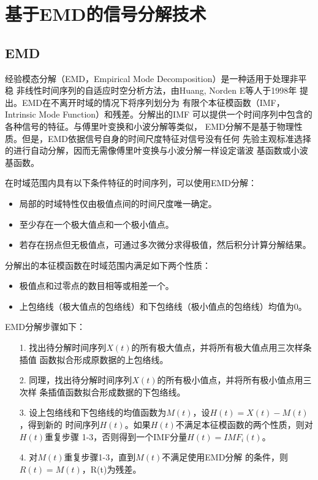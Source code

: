 \documentclass[AutoFakeBold]{LZUThesis}
\begin{document}
\section{基于EMD的信号分解技术}
\subsection{EMD}
经验模态分解（EMD，Empirical Mode Decomposition）是一种适用于处理非平稳
非线性时间序列的自适应时空分析方法，由Huang, Norden E等人于1998年
提出。EMD在不离开时域的情况下将序列划分为
有限个本征模函数（IMF，Intrinsic Mode Function）和残差。分解出的IMF
可以提供一个时间序列中包含的各种信号的特征。与傅里叶变换和小波分解等类似，
EMD分解不是基于物理性质。但是，EMD依据信号自身的时间尺度特征对信号没有任何
先验主观标准选择的进行自动分解，因而无需像傅里叶变换与小波分解一样设定谐波
基函数或小波基函数。

在时域范围内具有以下条件特征的时间序列，可以使用EMD分解：
\begin{itemize}
\item 局部的时域特性仅由极值点间的时间尺度唯一确定。
\item 至少存在一个极大值点和一个极小值点。
\item 若存在拐点但无极值点，可通过多次微分求得极值，然后积分计算分解结果。
\end{itemize}

分解出的本征模函数在时域范围内满足如下两个性质：
\begin{itemize}
\item 极值点和过零点的数目相等或相差一个。
\item 上包络线（极大值点的包络线）和下包络线（极小值点的包络线）均值为0。
\end{itemize}

EMD分解步骤如下：
\begin{itemize}
\item[1. ] 找出待分解时间序列$X(t)$的所有极大值点，并将所有极大值点用三次样条插值
函数拟合形成原数据的上包络线。
\item[2. ] 同理，找出待分解时间序列$X(t)$的所有极小值点，并将所有极小值点用三次样
条插值函数拟合形成数据的下包络线。
\item[3. ] 设上包络线和下包络线的均值函数为$M(t)$，设$H(t)=X(t)-M(t)$，得到新的
时间序列$H(t)$。如果$H(t)$不满足本征模函数的两个性质，则对$H(t)$重复步骤
1-3，否则得到一个IMF分量$H(t)=IMF_i(t)$。
\item[4. ] 对$M(t)$重复步骤1-3，直到$M(t)$不满足使用EMD分解
的条件，则$R(t)=M(t)$，R(t)为残差。
\end{itemize}
\end{document}
